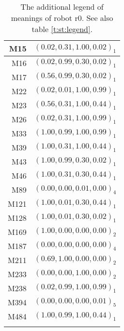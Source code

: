 \begin{table}[h]
\centering
{\footnotesize\begin{tabular}{rc}
\lsptoprule
M15 & $(0.02,0.31,1.00,0.02)_1$\\\hline
M16 & $(0.02,0.99,0.30,0.02)_1$\\\hline
M17 & $(0.56,0.99,0.30,0.02)_1$\\\hline
M22 & $(0.02,0.01,1.00,0.99)_1$\\\hline
M23 & $(0.56,0.31,1.00,0.44)_1$\\\hline
M26 & $(0.02,0.31,1.00,0.99)_1$\\\hline
M33 & $(1.00,0.99,1.00,0.99)_1$\\\hline
M39 & $(1.00,0.31,1.00,0.44)_1$\\\hline
M43 & $(1.00,0.99,0.30,0.02)_1$\\\hline
M46 & $(1.00,0.31,0.30,0.44)_1$\\\hline
M89 & $(0.00,0.00,0.01,0.00)_4$\\\hline
M121 & $(1.00,0.01,0.30,0.44)_1$\\\hline
M128 & $(1.00,0.01,0.30,0.02)_1$\\\hline
M169 & $(1.00,0.00,0.00,0.00)_2$\\\hline
M187 & $(0.00,0.00,0.00,0.00)_4$\\\hline
M211 & $(0.69,1.00,0.00,0.00)_2$\\\hline
M233 & $(0.00,0.00,1.00,0.00)_2$\\\hline
M238 & $(0.02,0.99,1.00,0.99)_1$\\\hline
M394 & $(0.00,0.00,0.00,0.01)_5$\\\hline
M484 & $(1.00,0.99,1.00,0.44)_1$\\
\lspbottomrule
\end{tabular}}
\caption{The additional legend of meanings of robot r0. See also table \ref{t:st:legend}.}
\label{t:st:legend0a}
\end{table}

